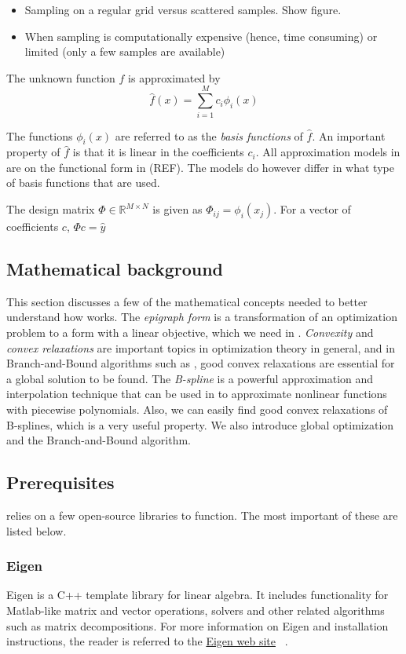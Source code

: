 \begin{itemize}
\item Sampling on a regular grid versus scattered samples. Show figure.
\item When sampling is computationally expensive (hence, time consuming) or limited (only a few samples are available)
\end{itemize}

The unknown function $f$ is approximated by
\begin{equation}
\hat{f}(x) = \sum\limits_{i=1}^{M} c_i \phi_i(x)
\end{equation}

The functions $\phi_i(x)$ are referred to as the \emph{basis functions} of $\hat{f}$. An important property of $\hat{f}$ is that it is linear in the coefficients $c_i$. All approximation models in \splinter{} are on the functional form in (REF). The models do however differ in what type of basis functions that are used.

The design matrix $\Phi \in \mathbb{R}^{M \times N}$ is given as $\Phi_{ij} = \phi_i(x_j)$. For a vector of coefficients $c$, $\Phi c = \hat{y}$


\subsection{Mathematical background}
\label{sec:mathematicalbakground}
This section discusses a few of the mathematical concepts needed to better understand how \splinter{} works. The \emph{epigraph form} is a transformation of an optimization problem to a form with a linear objective, which we need in \splinter{}. \emph{Convexity} and \emph{convex relaxations} are important topics in optimization theory in general, and in Branch-and-Bound algorithms such as \splinter{}, good convex relaxations are essential for a global solution to be found. The \emph{B-spline} is a powerful approximation and interpolation technique that can be used in \splinter{} to approximate nonlinear functions with piecewise polynomials. Also, we can easily find good convex relaxations of B-splines, which is a very useful property. We also introduce global optimization and the Branch-and-Bound algorithm.

\subsection{Prerequisites} \label{sec:prerequisites}
\splinter{} relies on a few open-source libraries to function. The most important of these are listed below.

\subsubsection{Eigen} \label{sec:eigen}
Eigen is a C++ template library for linear algebra. It includes functionality for Matlab-like matrix and vector operations, solvers and other related algorithms such as matrix decompositions. For more information on Eigen and installation instructions, the reader is referred to the {\color{blue} \href{http://eigen.tuxfamily.org/index.php?title=Main_Page}{Eigen web site}} ~\cite{eigen}.
